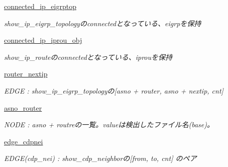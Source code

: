 \begin{DoxyCompactItemize}
\mbox{\hyperlink{classCiscoConf_1_1CiscoRoute_a8970f6863dda18ba44dea9d51f04580a}{connected\+\_\+ip\+\_\+eigrptop}}
\begin{DoxyCompactList}\small\item\em show\+\_\+ip\+\_\+eigrp\+\_\+topologyのconnectedとなっている、eigrpを保持 \end{DoxyCompactList}\item 
\mbox{\label{classCiscoConf_1_1CiscoRoute_a2ec0e2ede548edd2fe7ed698a528d458}} 
\mbox{\hyperlink{classCiscoConf_1_1CiscoRoute_a2ec0e2ede548edd2fe7ed698a528d458}{connected\+\_\+ip\+\_\+iprou\+\_\+obj}}
\begin{DoxyCompactList}\small\item\em show\+\_\+ip\+\_\+routeのconnectedとなっている、iprouを保持 \end{DoxyCompactList}\item 
\mbox{\label{classCiscoConf_1_1CiscoRoute_aca3e5649b39d84f347154f21e23a0da4}} 
\mbox{\hyperlink{classCiscoConf_1_1CiscoRoute_aca3e5649b39d84f347154f21e23a0da4}{router\+\_\+nextip}}
\begin{DoxyCompactList}\small\item\em E\+D\+GE \+: show\+\_\+ip\+\_\+eigrp\+\_\+topologyの\mbox{[}asno + router, asno + nextip, cnt\mbox{]} \end{DoxyCompactList}\item 
\mbox{\label{classCiscoConf_1_1CiscoRoute_ae4468a24271f5e36994c5987060d2bca}} 
\mbox{\hyperlink{classCiscoConf_1_1CiscoRoute_ae4468a24271f5e36994c5987060d2bca}{asno\+\_\+router}}
\begin{DoxyCompactList}\small\item\em N\+O\+DE \+: asno + routreの一覧。valueは検出したファイル名(base)。 \end{DoxyCompactList}\item 
\mbox{\label{classCiscoConf_1_1CiscoRoute_a49cf09e1530f6ba91c3b141167805ad1}} 
\mbox{\hyperlink{classCiscoConf_1_1CiscoRoute_a49cf09e1530f6ba91c3b141167805ad1}{edge\+\_\+cdpnei}}
\begin{DoxyCompactList}\small\item\em E\+D\+G\+E(cdp\+\_\+nei) \+: show\+\_\+cdp\+\_\+neighborの\mbox{[}from, to, cnt\mbox{]} のペア \end{DoxyCompactList}\end{DoxyCompactItemize}
